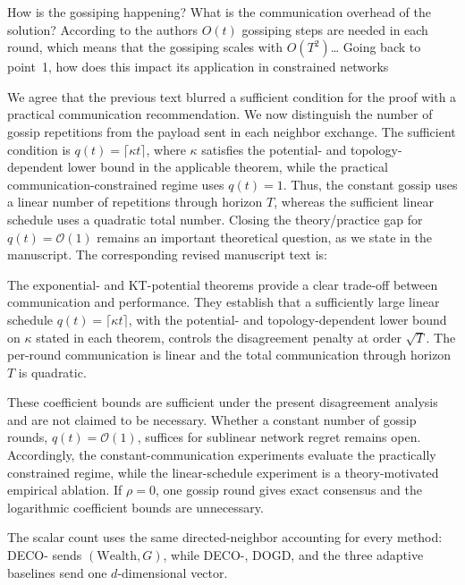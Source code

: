 \documentclass[12pt,english]{reviewresponse}
\newcommand{\order}[1]{\mathcal{O}\left(#1\right)}
\newcommand{\algname}{{DECO}\xspace}
\newcommand{\w}{\text{Wealth}}
\begin{document}
\begin{revcomment}
    How is the gossiping happening? What is the communication overhead of the solution? According to the authors $O(t)$ gossiping steps are needed in each round, which means that the gossiping scales with $O(T^2)$\ldots{} Going back to point~1, how does this impact its application in constrained networks
\end{revcomment}
\begin{revresponse}
    We agree that the previous text blurred a sufficient condition for the proof with a practical communication recommendation.  %
    We now distinguish the number of gossip repetitions from the payload sent in each neighbor exchange.
    The sufficient condition is $q(t)=\lceil\kappa t\rceil$, where $\kappa$ satisfies the potential- and topology-dependent lower bound in the applicable theorem, while the practical communication-constrained regime uses $q(t)=1$.  Thus, the constant gossip uses a linear number of repetitions through horizon $T$, whereas the sufficient linear schedule uses a quadratic total number.
    Closing the theory/practice gap for $q(t)=\order{1}$ remains an important theoretical question, as we state in the manuscript.
    The corresponding revised manuscript text is:
    \begin{changes}
        The exponential- and KT-potential theorems provide a clear trade-off between communication and performance.
        They establish that a sufficiently large linear schedule $q(t)=\lceil\kappa t\rceil$, with the potential- and topology-dependent lower bound on $\kappa$ stated in each theorem, controls the disagreement penalty at order $\sqrt{T}$. The per-round communication is linear and the total communication through horizon $T$ is quadratic.

        These coefficient bounds are sufficient under the present disagreement analysis and are not claimed to be necessary.
        Whether a constant number of gossip rounds, $q(t)=\mathcal{O}(1)$, suffices for sublinear network regret remains open.
        Accordingly, the constant-communication experiments evaluate the practically constrained regime, while the linear-schedule experiment is a theory-motivated empirical ablation.
        If $\rho=0$, one gossip round gives exact consensus and the logarithmic coefficient bounds are unnecessary.

        The scalar count uses the same directed-neighbor accounting for every method: \algname{}- sends $(\w,G)$, while \algname{}-, DOGD, and the three adaptive baselines send one $d$-dimensional vector.
    \end{changes}
\end{revresponse}
\end{document}

